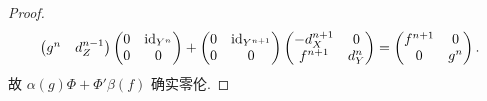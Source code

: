 \begin{proof}
\[\begin{pmatrix}
		g^n & d_Z^{n-1}
	\end{pmatrix} \begin{pmatrix}
		0 & \mathrm{id}_{Y^n} \\
		0 & 0
	\end{pmatrix} + \begin{pmatrix}
		0 & \mathrm{id}_{Y^{n+1}} \\
		0 & 0
	\end{pmatrix} \begin{pmatrix}
		-d_X^{n+1} & 0 \\
		f^{n+1} & d_Y^n
	\end{pmatrix} = \begin{pmatrix}
		f^{n+1} & 0 \\
		0 & g^n
	\end{pmatrix}.\]
	故 $\alpha(g)\Phi + \Phi'\beta(f)$ 确实零伦.
\end{proof}

